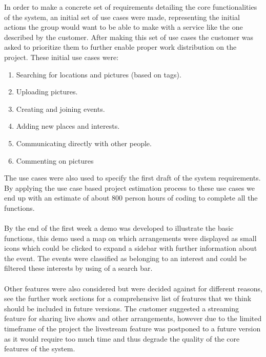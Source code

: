 In order to make a concrete set of requirements detailing the core functionalities of the system, an initial set of use cases were made, representing the initial actions the group would want to be able to make with a service like the one described by the customer. After making this set of use cases the customer was asked to prioritize them to further enable proper work distribution on the project. These initial use cases were:

\begin{enumerate}
  \item Searching for locations and pictures (based on tags).
  \item Uploading pictures.
  \item Creating and joining events.
  \item Adding new places and interests.
  \item Communicating directly with other people.
  \item Commenting on pictures
\end{enumerate}

The use cases were also used to specify the first draft of the system requirements. By applying the use case based project estimation process to these use cases we end up with an estimate of about 800 person hours of coding to complete all the functions.
\paragraph{} By the end of the first week a demo was developed to illustrate the basic functions, this demo used a map on which arrangements were displayed as small icons which could be clicked to expand a sidebar with further information about the event. The events were classified as belonging to an interest and could be filtered these interests by using of a search bar.
\paragraph{} Other features were also considered but were decided against for different reasons, see the further work sections for a comprehensive list of features that we think should be included in future versions. The customer suggested a streaming feature for sharing live shows and other arrangements, however due to the limited timeframe of the project the livestream feature was postponed to a future version as it would require too much time and thus degrade the quality of the core features of the system.

